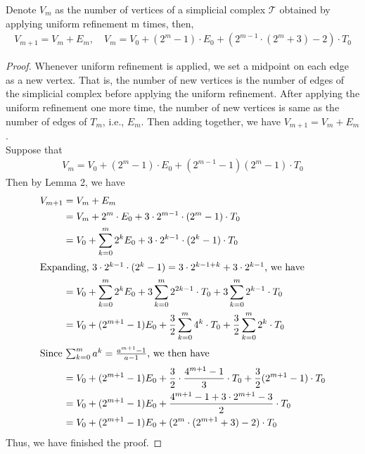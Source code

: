     \begin{lemma}
    Denote $V_{m}$ as the number of vertices of a simplicial complex $\mathcal{T}$ obtained by applying uniform refinement m times, then,
    \begin{align*}
    V_{m+1} = V_{m} + E_{m}, \quad V_m = V_0 + (2^m -1)\cdot E_0 + (2^{m-1}\cdot(2^m+3)-2)\cdot T_0
    \end{align*}
    \end{lemma}
    \begin{proof}
    Whenever uniform refinement is applied, we set a midpoint on each edge as a new vertex. That is, the number of new vertices is the number of edges of the simplicial complex before applying the uniform refinement. After applying the uniform refinement one more time, the number of new vertices is same as the number of edges of $T_m$, i.e., $E_m$. Then adding together, we have $V_{m+1} = V_m + E_m$.\\
    Suppose that 
    \begin{align*}
    V_m = V_0 + (2^m -1)\cdot E_0 + (2^{m-1} -1)(2^m -1)\cdot T_0
    \end{align*} 
    Then by Lemma 2, we have
    \begin{align*}
    V_{m+1} &= V_m + E_m\\
    &= V_m + 2^m\cdot E_0 + 3\cdot 2^{m-1}\cdot(2^m-1)\cdot T_0\\
    &= V_0 + \sum_{k=0}^m 2^k E_0 + 3\cdot 2^{k-1}\cdot(2^k-1)\cdot T_0\\
    \intertext{Expanding, $3\cdot 2^{k-1}\cdot(2^k-1) = 3\cdot2^{k-1+k} + 3\cdot2^{k-1}$, we have}
    &= V_0 + \sum_{k=0}^m 2^k E_0 + 3\sum_{k=0}^m 2^{2k-1}\cdot T_0 + 3\sum_{k=0}^m 2^{k-1}\cdot T_0\\
    &= V_0 + (2^{m+1}-1)E_0 + \frac{3}{2}\sum_{k=0}^m 4^k\cdot T_0 + \frac{3}{2}\sum_{k=0}^m 2^k\cdot T_0\\
    \intertext{Since $\sum_{k=0}^m a^k = \frac{a^{m+1}-1}{a-1}$, we then have}
    &= V_0 + (2^{m+1}-1)E_0 + \frac{3}{2}\cdot\frac{4^{m+1}-1}{3}\cdot T_0 + \frac{3}{2}(2^{m+1}-1)\cdot T_0\\
    &= V_0 + (2^{m+1}-1)E_0 + \frac{4^{m+1}-1 + 3\cdot2^{m+1} -3}{2}\cdot T_0\\
    &= V_0 + (2^{m+1}-1)E_0 + (2^m\cdot(2^{m+1}+3)-2)\cdot T_0
    \end{align*}
    Thus, we have finished the proof.
    \end{proof}


